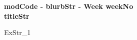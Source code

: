 \documentclass[a4paper, leqno, 12pt]{article}
\newenvironment{top_enumerate}{
\begin{enumerate}
  \setlength{\itemsep}{2em}
  \setlength{\topsep}{-0pt}
  \setlength{\partopsep}{-0pt}
}{\end{enumerate}}
\begin{document}
\singlespacing
\begin{center}
\textbf{
modCode - blurbStr - Week weekNo\\
\bigskip
titleStr
}
\end{center}
\bigskip

\begin{top_enumerate}

ExStr_1

\end{top_enumerate}
\end{document}
